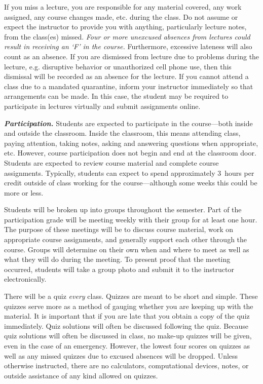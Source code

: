 \documentclass[11pt,letterpaper]{article}
\begin{document}
If you miss a lecture, you are responsible for any material covered, any work assigned, any course changes made, etc. during the class. Do not assume or expect the instructor to provide you with anything, particularly lecture notes, from the class(es) missed. {\itshape Four or more unexcused absences from lectures could result in receiving an `F' in the course.} Furthermore, excessive lateness will also count as an absence. If you are dismissed from lecture due to problems during the lecture, e.g. disruptive behavior or unauthorized cell phone use, then this dismissal will be recorded as an absence for the lecture. If you cannot attend a class due to a mandated quarantine, inform your instructor immediately so that arrangements can be made. In this case, the student may be required to participate in lectures virtually and submit assignments online. \pspace

{\itshape\bfseries\color{stacred}Participation.} 
Students are expected to participate in the course---both inside and outside the classroom. Inside the classroom, this means attending class, paying attention, taking notes, asking and answering questions when appropriate, etc. However, course participation does not begin and end at the classroom door. Students are expected to review course material and complete course assignments. Typically, students can expect to spend approximately 3~hours per credit outside of class working for the course---although some weeks this could be more or less. \pspace

Students will be broken up into groups throughout the semester. Part of the participation grade will be meeting weekly with their group for at least one hour. The purpose of these meetings will be to discuss course material, work on appropriate course assignments, and generally support each other through the course. Groups will determine on their own when and where to meet as well as what they will do during the meeting. To present proof that the meeting occurred, students will take a group photo and submit it to the instructor electronically. 
\sectionbreak



There will be a quiz \textit{every} class. Quizzes are meant to be short and simple. These quizzes serve more as a method of gauging whether you are keeping up with the material. It is important that if you are late that you obtain a copy of the quiz immediately. Quiz solutions will often be discussed following the quiz. Because quiz solutions will often be discussed in class, no make-up quizzes will be given, even in the case of an emergency. However, the lowest four scores on quizzes as well as any missed quizzes due to excused absences will be dropped. Unless otherwise instructed, there are no calculators, computational devices, notes, or outside assistance of any kind allowed on quizzes. 
\sectionbreak
\end{document}
